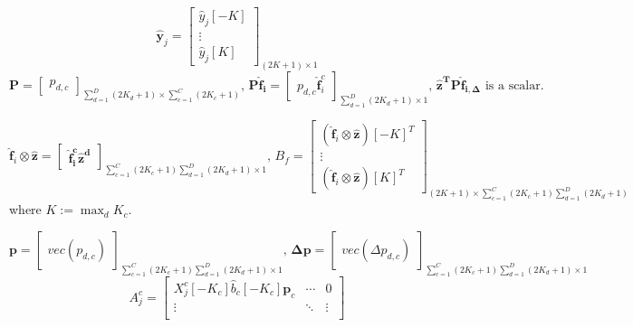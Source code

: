 \documentclass[12pt]{article}
\numberwithin{equation}{section}
\begin{document}
{\begin{equation}
\end{equation}
\begin{equation}
	 \hat{\bm{y}}_j= 
	\begin{bmatrix}
		\hat{y}_j[-K] \\  \vdots \\ \hat{y}_j[K] 
	\end{bmatrix}_{(2K+1) \times 1}
\end{equation}
\begin{equation}
	\bm{P}=
	\begin{bmatrix}
		p_{d, c}
	\end{bmatrix}_{\sum^{D}_{d=1}(2K_d+1) \times \sum^{C}_{c=1}(2K_c+1)}
	\text{, }
	\bm{P}\bm{\hat{f}_i}=
	\begin{bmatrix}
		p_{d, c}\bm{\hat{f}}^c_i 
	\end{bmatrix}_{\sum^{D}_{d=1}(2K_d+1) \times 1}
	\text{, }
	\bm{\hat{z}^TP\hat{f}_{i,\Delta}} \text{ is a scalar.}
\end{equation}\par
\begin{equation}
	\bm{\hat{f}}_i \otimes \bm{\hat{z}}=
	\begin{bmatrix}
		\bm{\hat{f}^c_i\hat{z}^d}
	\end{bmatrix}_{\sum^{C}_{c=1}(2K_c+1)\sum^{D}_{d=1}(2K_d+1) \times 1}
	\text{, }
	 B_f= 
	\begin{bmatrix}
		(\bm{\hat{f}}_i \otimes \bm{\hat{z}})[-K]^T \\  \vdots \\ (\bm{\hat{f}}_i \otimes \bm{\hat{z}})[K]^T
	\end{bmatrix}_{(2K+1) \times \sum^{C}_{c=1}(2K_c+1)\sum^{D}_{d=1}(2K_d+1)}
\end{equation}
where $K:=\max_dK_c$.  \par
\begin{equation}
 	\bm{p}= 
	\begin{bmatrix}
		vec(p_{d,c})
	\end{bmatrix}_{\sum^{C}_{c=1}(2K_c+1)\sum^{D}_{d=1}(2K_d+1) \times 1}
	 \text{,   }
	 \bm{\Delta p}= 
	\begin{bmatrix}
		vec(\Delta p_{d,c})
	\end{bmatrix}_{\sum^{C}_{c=1}(2K_c+1)\sum^{D}_{d=1}(2K_d+1) \times 1}
\end{equation}
\begin{equation}
	A^c_j = 
	\begin{bmatrix}
		X^c_j[-K_c]\hat{b}_c[-K_c] \bm{p}_c & \cdots & 0 \\
		\vdots & \ddots & \vdots \\

\end{bmatrix}
\end{equation}}
\end{document}
